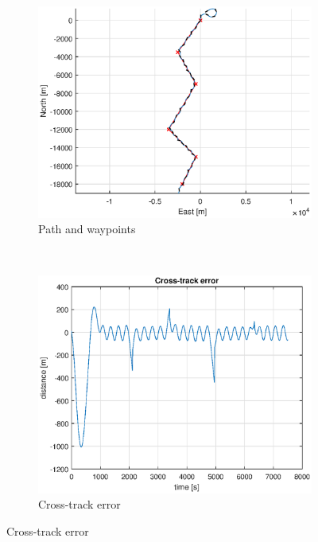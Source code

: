 \begin{figure}[ht]
	\begin{subfigure}[b]{0.4\textwidth}
		\includegraphics[width=\textwidth]{path_2_6}
		\caption{Path and waypoints}
		\label{fig:path_2_6}
	\end{subfigure}%
        ~
	\begin{subfigure}[b]{0.4\textwidth}
		\includegraphics[width=\textwidth]{cross_track_error2_6}
		\caption{Cross-track error}
		\label{fig:cross_track_error2_6}
	\end{subfigure}
	\label{fig:task2_6}
\end{figure}

